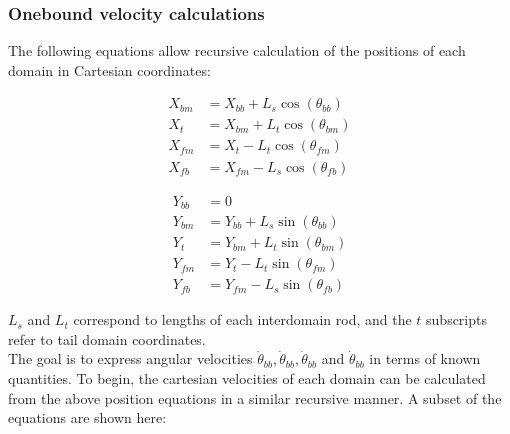 \documentclass[
11pt, %
english, %
singlespacing, %
headsepline, %
chapterinoneline, %
]{MastersDoctoralThesis} %
\begin{document}
\subsubsection{Onebound velocity calculations}

The following equations allow recursive calculation of the positions of each domain in Cartesian coordinates:

\noindent\begin{minipage}{0.49\linewidth}
\begin{align}
  X_{bm} &= X_{bb}+L_{s}\cos(\theta_{bb}) \\
  X_{t}  &= X_{bm}+L_{t}\cos(\theta_{bm}) \\
  X_{fm} &= X_{t} - L_{t}\cos(\theta_{fm}) \\
  X_{fb} &= X_{fm} - L_{s}\cos(\theta_{fb})
\end{align}
\end{minipage}
\begin{minipage}{0.49\linewidth}
\begin{align}
  Y_{bb} &= 0 \\
  Y_{bm} &= Y_{bb}+L_{s}\sin(\theta_{bb}) \\
  Y_{t}  &= Y_{bm}+L_{t}\sin(\theta_{bm}) \\
  Y_{fm} &= Y_{t} - L_{t}\sin(\theta_{fm}) \\
  Y_{fb} &= Y_{fm} - L_{s}\sin(\theta_{fb})
\end{align}
\end{minipage}
\vspace{.5cm}

$L_s$ and $L_t$ correspond to lengths of each interdomain rod, and the $t$ subscripts refer to tail domain coordinates.\\

The goal is to express angular velocities $\dot{\theta}_{bb}, \dot{\theta}_{bb}, \dot{\theta}_{bb}$ and $\dot{\theta}_{bb}$ in terms of known quantities. To begin, the cartesian velocities of each domain can be calculated from the above position equations in a similar recursive manner. A subset of the equations are shown here:
\end{document}
